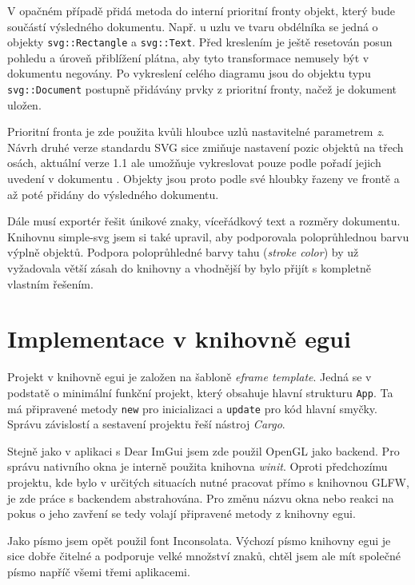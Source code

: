 \documentclass[FM,DP]{tulthesis}
\begin{document}
	V opačném případě přidá metoda do interní prioritní fronty objekt, který bude součástí výsledného dokumentu. Např. u uzlu ve tvaru obdélníka se jedná o objekty \texttt{svg::Rectangle} a \texttt{svg::Text}. Před kreslením je ještě resetován posun pohledu a úroveň přiblížení plátna, aby tyto transformace nemusely být v dokumentu negovány. Po vykreslení celého diagramu jsou do objektu typu \texttt{svg::Document} postupně přidávány prvky z prioritní fronty, načež je dokument uložen.
	
	Prioritní fronta je zde použita kvůli hloubce uzlů nastavitelné parametrem \textit{z}. Návrh druhé verze standardu SVG sice zmiňuje nastavení pozic objektů na třech osách, aktuální verze 1.1 ale umožňuje vykreslovat pouze podle pořadí jejich uvedení v dokumentu \cite{std_svg}. Objekty jsou proto podle své hloubky řazeny ve frontě a až poté přidány do výsledného dokumentu.
	
	Dále musí exportér řešit únikové znaky, víceřádkový text a rozměry dokumentu. Knihovnu simple-svg jsem si také upravil, aby podporovala poloprůhlednou barvu výplně objektů. Podpora poloprůhledné barvy tahu (\textit{stroke color}) by už vyžadovala větší zásah do knihovny a vhodnější by bylo přijít s kompletně vlastním řešením.
	
	\section{Implementace v knihovně egui}
	
	Projekt v knihovně egui je založen na šabloně \textit{eframe template}. Jedná se v podstatě o minimální funkční projekt, který obsahuje hlavní strukturu \texttt{App}. Ta má \mbox{připravené} metody \texttt{new} pro inicializaci a \texttt{update} pro kód hlavní smyčky. Správu závislostí a sestavení projektu řeší nástroj \textit{Cargo}.%
	
	Stejně jako v aplikaci s Dear ImGui jsem zde použil OpenGL jako backend. Pro správu nativního okna je interně použita knihovna \textit{winit}. Oproti předchozímu projektu, kde bylo v určitých situacích nutné pracovat přímo s knihovnou GLFW, je zde práce s backendem abstrahována. Pro změnu názvu okna nebo reakci na pokus o jeho zavření se tedy volají připravené metody z knihovny egui.
	
	Jako písmo jsem opět použil font Inconsolata. Výchozí písmo knihovny egui je sice dobře čitelné a podporuje velké množství znaků, chtěl jsem ale mít společné písmo napříč všemi třemi aplikacemi.
	
\end{document}
